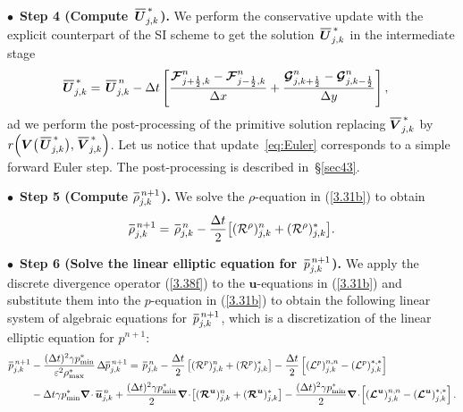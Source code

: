 \documentclass[A4paper,12pt,twoside]{article}
\numberwithin{equation}{section}
\numberwithin{figure}{section}
\numberwithin{table}{section}
\def\bnabla{\bm{\nabla}}
\newcommand{\dt}{\Delta t}
\newcommand{\dx}{\Delta x}
\newcommand{\dy}{\Delta y}
\newcommand{\kph}{{k+\frac{1}{2}}}
\newcommand{\kmh}{{k-\frac{1}{2}}}
\newcommand{\jph}{{j+\frac{1}{2}}}
\newcommand{\jmh}{{j-\frac{1}{2}}}
\newcommand{\ve}{\varepsilon}
\newcommand\eref[1]{(\ref{#1})}
\newcommand*\xbar[1]{%
  \hbox{%
    \vbox{%
      \hrule height 0.5pt %
      \kern0.4ex%
      \hbox{%
        \kern-0.05em%
        \ensuremath{#1}%
        \kern-0.00em%
      }%
    }%
  }%
}
\newcommand{\uvec}[2][3]{\boldsymbol{#2\mkern-#1mu}\mkern#1mu}
\newcommand{\lore}[1]{{\leavevmode\color{red} #1}}
\begin{document}
\smallskip
\noindent
$\bullet\,$ \textbf{Step 4 (Compute $\,\xbar{\bm U}^{\,*}_{j,k}$).} 
\lore{We perform the conservative update with the explicit counterpart of the SI scheme to get the solution $\,\xbar{\bm U}^{\,*}_{j,k}$ in the intermediate stage
\begin{equation}
	\begin{aligned}
		\xbar{\bm U}^{\,*}_{j,k}=\,\xbar{\bm U}^{\,n}_{j,k}&-\dt\left[\frac{\bm{{\cal F}}_{\jph,k}^n-\bm{{\cal F}}_{\jmh,k}^n}{\dx}+
		\frac{\bm{{\cal G}}_{j,\kph}^n-\bm{{\cal G}}_{j,\kmh}^n}{\dy}\right],
		\label{eq:Euler}
	\end{aligned}
\end{equation}
ad we perform the post-processing of the primitive solution replacing $\xbar{\bm V}^{\,*}_{j,k}$ by  $r\Big(\bm V\big(\,\xbar{\bm U}^{\,*}_{j,k}\big),\,\xbar{\bm V}^{\,*}_{j,k}\Big)$. Let us notice that update~\eqref{eq:Euler} corresponds to a simple forward Euler step. The post-processing is described in~\S\ref{sec43}.}


\smallskip
\noindent
$\bullet\,$ \textbf{Step 5 (Compute $\xbar\rho^{\,n+1}_{j,k}$).} We solve the $\rho$-equation in \eref{3.31b} to obtain
\begin{equation*}
\xbar\rho^{\,n+1}_{j,k}=\,\xbar\rho^{\,n}_{j,k}-\frac{\dt}{2}\big[({\cal R}^\rho)^n_{j,k}+({\cal R}^\rho)^*_{j,k}\big].
\end{equation*}

\smallskip
\noindent
$\bullet\,$ \textbf{Step 6 (Solve the linear elliptic equation for $\,\xbar p^{\,n+1}_{j,k}$).} We apply the discrete divergence operator
\eref{3.38f} to the $\bm u$-equations in \eref{3.31b} and substitute them into the $p$-equation in \eref{3.31b} to obtain the following
linear system of algebraic equations for $\,\xbar p^{\,n+1}_{j,k}$, which is a discretization of the linear elliptic equation for $p^{n+1}$:
\begin{equation*}
\begin{aligned}
\xbar p^{\,n+1}_{j,k}&-\frac{(\dt)^2\gamma p_{\min}^*}{\ve^2\rho_{\max}^*}\,\Delta\xbar p_{j,k}^{\,n+1}=\,\xbar p^{\,n}_{j,k}-
\frac{\dt}{2}\left[({\cal R}^p)_{j,k}^n+({\cal R}^p)_{j,k}^*\right]-
\frac{\dt}{2}\left[({\cal L}^p)^{n,n}_{j,k}-({\cal L}^p)^{*,*}_{j,k}\right]\\
&-\dt\gamma p_{\min}^*\bnabla\!\cdot\xbar{\bm u}_{j,k}^{\,n}
+\frac{(\dt)^2\gamma p_{\min}^*}{2}\bnabla\!\cdot\!\left[(\bm{{\cal R}}^{\bm u})^n_{j,k}+(\bm{{\cal R}}^{\bm u})^*_{j,k}\right]
-\frac{(\dt)^2\gamma p_{\min}^*}{2}\bnabla\!\cdot\!\left[(\bm{{\cal L}}^{\uvec{u}})^{n,n}_{j,k}-(\bm{{\cal L}}^{\uvec{u}})^{*,*}_{j,k}\right].
\end{aligned}
\label{3.40f}
\end{equation*}
\end{document}
